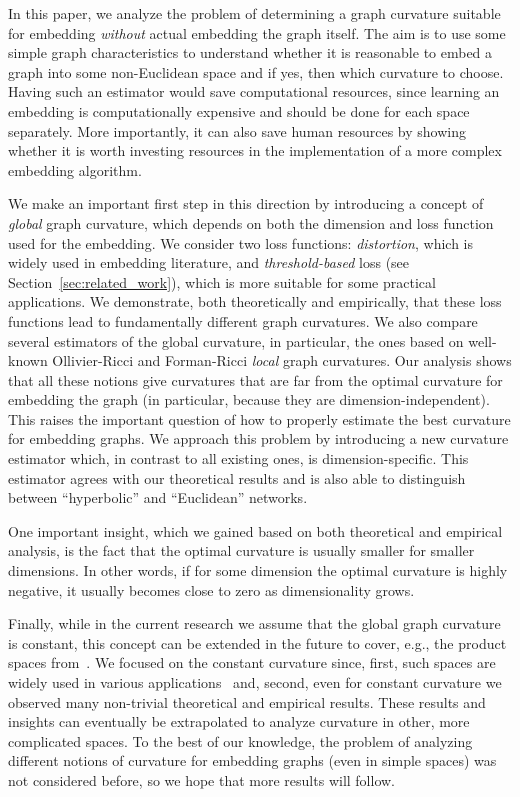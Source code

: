 \documentclass{article} %
\begin{document}
In this paper, we analyze the problem of determining a graph curvature suitable for embedding \textit{without} actual embedding the graph itself. The aim is to use some simple graph characteristics to understand whether it is reasonable to embed a graph into some non-Euclidean space and if yes, then which curvature to choose. 
Having such an estimator would save computational resources, since learning an embedding is computationally expensive and should be done for each space separately. 
More importantly, it can also save human resources by showing whether it is worth investing resources in the implementation of a more complex embedding algorithm.

We make an important first step in this direction by introducing a concept of \textit{global} graph curvature, which depends on both the dimension and loss function used for the embedding. We consider two loss functions: \emph{distortion}, which is widely used in embedding literature, and \emph{threshold-based} loss (see Section~\ref{sec:related_work}), which is more suitable for some practical applications. We demonstrate, both theoretically and empirically, that these loss functions lead to fundamentally different graph curvatures. 
We also compare several estimators of the global curvature, in particular, the ones based on well-known Ollivier-Ricci and Forman-Ricci \textit{local} graph curvatures. Our analysis shows that all these notions give curvatures that are far from the optimal curvature for embedding the graph (in particular, because they are dimension-independent). This raises the important question of how to properly estimate the best curvature for embedding graphs. 
We approach this problem by introducing a new curvature estimator which, in contrast to all existing ones, is dimension-specific. This estimator agrees with our theoretical results and is also able to distinguish between ``hyperbolic'' and ``Euclidean'' networks.

One important insight, which we gained based on both theoretical and empirical analysis, is the fact that the optimal curvature is usually smaller for smaller dimensions. In other words, if for some dimension the optimal curvature is highly negative, it usually becomes close to zero as dimensionality grows.

Finally, while in the current research we assume that the global graph curvature is constant, this concept can be extended in the future to cover, e.g., the product spaces from~\citep{gu2019learning}. We focused on the constant curvature since, first, such spaces are widely used in various applications~\citep{tifrea2018poincar} and, second, even for constant curvature we observed many non-trivial theoretical and empirical results.
These results and insights can eventually be extrapolated to analyze curvature in other, more complicated spaces. To the best of our knowledge, the problem of analyzing different notions of curvature for embedding graphs (even in simple spaces) was not considered before, so we hope that more results will follow.
\end{document}
